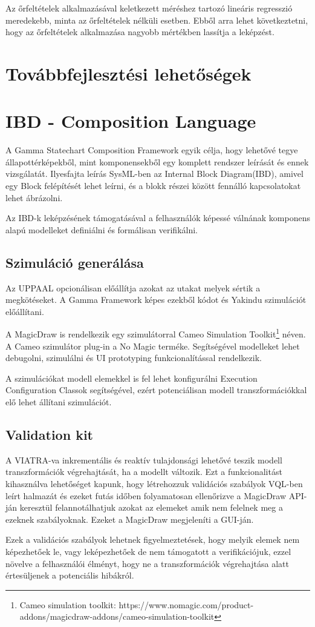 Az őrfeltételek alkalmazásával keletkezett méréshez tartozó lineáris regresszió meredekebb, minta az őrfeltételek nélküli esetben. Ebből arra lehet következtetni, hogy az őrfeltételek alkalmazása nagyobb mértékben lassítja a leképzést.

\clearpage\section{Továbbfejlesztési lehetőségek}
\label{sec:jovoben}
\section{IBD - Composition Language}
A Gamma Statechart Composition Framework egyik célja, hogy lehetővé tegye állapottérképekből, mint komponensekből egy komplett rendszer leírását és ennek vizsgálatát. Ilyesfajta leírás SysML-ben az Internal Block Diagram(IBD), amivel egy Block felépítését lehet leírni, és a blokk részei között fennálló kapcsolatokat lehet ábrázolni.

Az IBD-k leképzésének támogatásával a felhasználók képessé válnának komponens alapú modelleket definiálni és formálisan verifikálni.

\subsection{Szimuláció generálása}

Az UPPAAL opcionálisan előállítja azokat az utakat melyek sértik a megkötéseket. A Gamma Framework képes ezekből kódot és Yakindu szimulációt előállítani.

A MagicDraw is rendelkezik egy szimulátorral Cameo Simulation Toolkit\footnote{Cameo simulation toolkit: https://www.nomagic.com/product-addons/magicdraw-addons/cameo-simulation-toolkit} néven. A Cameo szimulátor plug-in a No Magic terméke. Segítségével modelleket lehet debugolni, szimulálni és UI prototyping funkcionalítással rendelkezik.

A szimulációkat modell elemekkel is fel lehet konfigurálni Execution Configuration Classok segítségével, ezért potenciálisan modell transzformációkkal elő lehet állítani szimulációt.

\subsection{Validation kit}

A VIATRA-va inkrementális és reaktív tulajdonsági lehetővé teszik modell transzformációk végrehajtását, ha a modellt változik. Ezt a funkcionalitást kihasználva lehetőséget kapunk, hogy létrehozzuk validációs szabályok VQL-ben leírt halmazát és ezeket futás időben folyamatosan ellenőrizve a MagicDraw API-ján keresztül felannotálhatjuk azokat az elemeket amik nem felelnek meg a ezeknek szabályoknak. Ezeket a MagicDraw megjeleníti a GUI-ján.

Ezek a validációs szabályok lehetnek figyelmeztetések, hogy melyik elemek nem képezhetőek le, vagy leképezhetőek de nem támogatott a verifikációjuk, ezzel növelve a felhasználói élményt, hogy ne a transzformációk végrehajtása alatt értesüljenek a potenciális hibákról.





